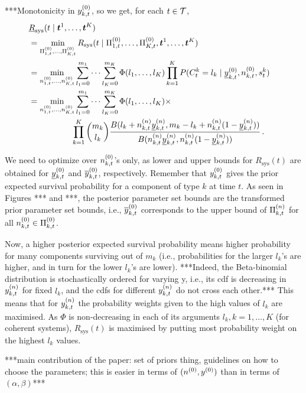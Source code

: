 \documentclass[authoryear, 12pt, a4paper]{elsarticle}
\newcommand{\bs}[1]{\boldsymbol{#1}}
\renewcommand{\vec}[1]{{\bs#1}}
\newcommand{\ul}[1]{\underline{#1}}
\newcommand{\Rsys}{R_\text{sys}}
\newcommand{\lRsys}{\ul{R}_\text{sys}}
\begin{document}
***Monotonicity in $y^{(0)}_{k,t}$, so we get, for each $t \in {\cal T}$,
\begin{align*}
\lefteqn{\lRsys(t \mid \vec{t}^1, \ldots, \vec{t}^K)}\\
 &= \min_{\PtZi{1}, \ldots, \PtZi{K}} \Rsys(t \mid \PtZi{1}, \ldots, \PtZi{K}, \vec{t}^1, \ldots, \vec{t}^K) \\
 &= \min_{\nz_{1,t},\ldots,\nz_{K,t}} 
    \sum_{l_1=0}^{m_1} \cdots \sum_{l_K=0}^{m_K} \Phi(l_1, \ldots, l_K)
                                                 \prod_{k=1}^K P(C^k_t = l_k \mid \yktzl, \nktz, s^k_t) \\
 &= \min_{\nz_{1,t},\ldots,\nz_{K,t}} 
    \sum_{l_1=0}^{m_1} \cdots \sum_{l_K=0}^{m_K} \Phi(l_1, \ldots, l_K) \times \\ & \hspace*{12ex}
    \prod_{k=1}^K {m_k \choose l_k} \frac{B(l_k + \nn_{k,t}\ynl_{k,t}, m_k - l_k + \nn_{k,t}(1-\ynl_{k,t}))}
                                         {B(\nn_{k,t}\ynl_{k,t}, \nn_{k,t}(1-\ynl_{k,t}))} \,.
\end{align*}

We need to optimize over $n^{(0)}_{k,t}$'s only,
as lower and upper bounds for $\Rsys(t)$ are obtained for $\yktzl$ and $\overline{y}^{(0)}_{k,t}$, respectively.
Remember that $y^{(0)}_{k,t}$ gives the prior expected survival probability for a component of type $k$ at time $t$.
As seen in Figures *** and ***, the posterior parameter set bounds are the transformed prior parameter set bounds,
i.e., $\overline{y}^{(0)}_{k,t}$ corresponds to the upper bound of $\Pi^{(n)}_{k,t}$ for all $n^{(0)}_{k,t} \in \Pi^{(0)}_{k,t}$.

Now, a higher posterior expected survival probability means
higher probability for many components surviving out of $m_k$
(i.e., probabilities for the larger $l_k$'s are higher, and in turn for the lower $l_k$'s are lower).
***Indeed, the Beta-binomial distribution is stochastically ordered for varying y, i.e.,
its cdf is decreasing in $y^{(n)}_{k,t}$ for fixed $l_k$, and the cdfs for different $y^{(n)}_{k,t}$ do not cross each other.***
This means that for $y^{(n)}_{k,t}$ the probability weights given to the high values of $l_k$ are maximised.
As $\Phi$ is non-decreasing in each of its arguments $l_k, k=1,\ldots,K$ (for coherent systems),
$\Rsys(t)$ is maximised by putting most probability weight on the highest $l_k$ values.



***main contribution of the paper:
set of priors thing,
guidelines on how to choose the parameters;
this is easier in terms of $(n^{(0)}, y^{(0)})$ than in terms of $(\alpha, \beta)$***
\end{document}
